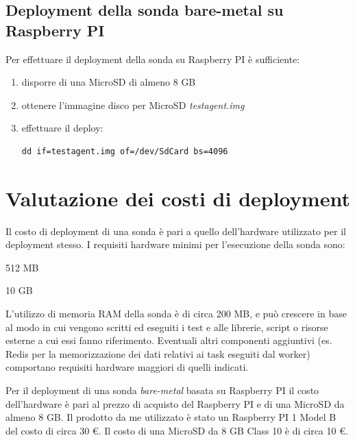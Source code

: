 \documentclass[../main.tex]{subfiles}
\begin{document}
\subsection {Deployment della sonda bare-metal su Raspberry PI}
Per effettuare il deployment della sonda su Raspberry PI è sufficiente:
\begin{enumerate}
\item disporre di una MicroSD di almeno 8 GB
\item ottenere l'immagine disco per MicroSD \textit{testagent.img}
\item effettuare il deploy:
\begin{Verbatim}
dd if=testagent.img of=/dev/SdCard bs=4096
\end{Verbatim}
\end{enumerate}
\section{Valutazione dei costi di deployment}
Il costo di deployment di una sonda è pari a quello dell'hardware utilizzato per il deployment stesso.
I requisiti hardware minimi per l'esecuzione della sonda sono:
\begin{description}[nolistsep]
\item[RAM] 512 MB
\item[Hard Disk] 10 GB
\end{description}
L'utilizzo di memoria RAM della sonda è di circa 200 MB, e può crescere in base al modo in cui vengono scritti ed eseguiti i test e alle librerie, script o risorse esterne a cui essi fanno riferimento.
Eventuali altri componenti aggiuntivi (es. Redis per la memorizzazione dei dati relativi ai task eseguiti dal worker) comportano requisiti hardware maggiori di quelli indicati.

Per il deployment di una sonda \textit{bare-metal} basata su Raspberry PI il costo dell'hardware è pari al prezzo di acquisto del Raspberry PI e di una MicroSD da almeno 8 GB.
Il prodotto da me utilizzato è stato un Raspberry PI 1 Model B del costo di circa 30 \euro.
Il costo di una MicroSD da 8 GB Class 10 è di circa 10 \euro.
\end{document}
